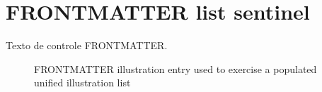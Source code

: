 \documentclass{abntexto-ufc}
\begin{document}
\pretextual

\ufcPrintListOfIllustrations

\textual
\section{FRONTMATTER list sentinel}
Texto de controle FRONTMATTER.

\begin{figure}[htbp]
  \centering
  \fbox{\rule{0pt}{2cm}\rule{0.5\textwidth}{0pt}}
  \caption[FRONTMATTER illustration entry]{FRONTMATTER illustration entry used to exercise a populated unified illustration list}
\end{figure}
\end{document}
